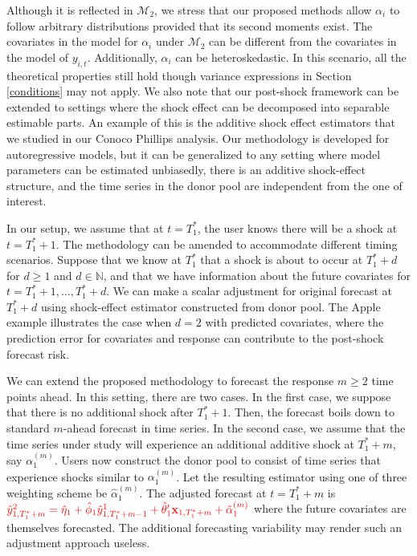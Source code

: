 \documentclass[11pt,3p,review,authoryear]{elsarticle}
\def\mc#1{\mathcal{#1}} %
\theoremstyle{definition}
\begin{document}
Although it is reflected in $\mc{M}_2$, we stress that our proposed methods allow $\alpha_i$ to follow arbitrary distributions provided that its second moments exist. The covariates in the model for $\alpha_i$ under $\mc{M}_2$ can be different from the covariates in the model of $y_{i,t}$.  Additionally, $\alpha_i$ can be heteroskedastic. In this scenario, all the theoretical properties still hold though variance expressions in Section \ref{conditions} may not apply. We also note that our post-shock framework can be extended to settings where the shock effect can be decomposed into separable estimable parts. An example of this is the additive shock effect estimators that we studied in our Conoco Phillips analysis. Our methodology is developed for autoregressive models, but it can be generalized to any setting  where model parameters can be estimated unbiasedly, there is an additive shock-effect structure, and the time series in the donor pool are independent from the one of interest.

In our setup, we assume that at $t=T_1^*$, the user knows there will be a shock at $t=T_1^*+1$. The methodology can be amended to accommodate different timing scenarios. Suppose that we know at $T_1^*$ that a shock is about to occur at $T_1^* + d$ for $d\geq 1$ and $d\in \mathbb{N}$, and that we have information about the future covariates for $t = T_1^* +1 , \ldots, T_1^* + d$. We can make a scalar adjustment for original forecast at $T_1^*+d$ using shock-effect estimator constructed from donor pool. The Apple example illustrates the case when $d = 2$ with predicted covariates, where the prediction error for covariates and response can contribute to the post-shock forecast risk.


We can extend the proposed methodology to forecast the response $m\geq 2$ time points ahead. In this setting, there are two cases. In the first case, we suppose that there is no additional shock after $T_1^*+1$. Then, the forecast boils down to standard $m$-ahead forecast in time series. In the second case, we assume that the time series under study will experience an additional additive shock at $T_1^* + m$, say $\alpha_1^{(m)}$. Users now construct the donor pool to consist of time series that experience shocks similar to  $\alpha_1^{(m)}$. Let the resulting estimator using one of  three weighting scheme be $\hat{\alpha}_1^{(m)}$.  The adjusted forecast at $t = T_1^* + m$ is
$
 \textcolor{red}{ \hat{y}^2_{1, T_1^*+m}=\hat{\eta}_1 + \hat{\phi}_1 \hat{y}_{1, T_1^* + m - 1}^1 + \hat{\theta}_1' \mathbf{x}_{1, T_1^* +m} + \hat{\alpha}_1^{(m)}}
$
where the future covariates are themselves forecasted. The additional forecasting variability may  render such an adjustment approach useless.
\end{document}
